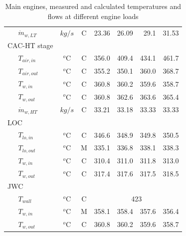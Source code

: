 \documentclass[preprint,12pt]{elsarticle}
\begin{document}
\begin{table}
\begin{tabular}{llccrrrr}
		& 	$\dot{m}_{w,LT}$  	& $kg/s$ & C& 23.36 & 26.09 & 29.1 & 31.53 \\
		\multicolumn{2}{l}{CAC-HT stage} & & & & & & \\
		&	$T_{air,in}$   		& $^o$C & C  & 356.0 & 409.4 & 434.1 & 461.7 \\
		&	$T_{air,out}$   	& $^o$C & C  & 355.2 & 350.1 & 360.0 & 368.7 \\ 
		&	$T_{w,in}$    		& $^o$C & C  & 360.8 & 360.2 & 359.6 & 358.7 \\ 
		&	$T_{w,out}$   		& $^o$C & C  & 360.8 & 362.6 & 363.6 & 365.4 \\
		& 	$\dot{m}_{w,HT}$  	& $kg/s$ & C & 33.21 & 33.18 & 33.33 & 33.33 \\
		\multicolumn{2}{l}{LOC} & & & & & &  \\
		&	$T_{lo,in}$   		& $^o$C & C  &346.6 & 348.9 & 349.8 & 350.5 \\ 
		&	$T_{lo,out}$    	& $^o$C & M  & 335.1 & 336.8 & 338.1 & 338.3 \\ 
		&	$T_{w,in}$    		& $^o$C & C  & 310.4 & 311.0 & 311.8 & 313.0 \\
		&	$T_{w,out}$   		& $^o$C & C  & 317.4 & 317.6 & 317.5 & 318.5 \\ 
		\multicolumn{2}{l}{JWC} & & & & & &  \\
		&	$T_{wall}$    		& $^o$C & C  & \multicolumn{4}{c}{423}  \\ 
		&	$T_{w,in}$    		& $^o$C & M  & 358.1 & 358.4 & 357.6 & 356.4 \\ 
		&	$T_{w,out}$	   		& $^o$C & C  & 360.8 & 360.2 & 359.6 & 358.7 \\ 
		\hline
	\end{tabular}
	\caption{Main engines, measured and calculated temperatures and flows at different engine loads}
	\label{tab:ME_values}
\end{table}
\end{document}
